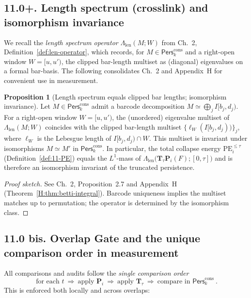 \documentclass[11pt]{article}
\numberwithin{equation}{section}
\theoremstyle{plain}
\theoremstyle{definition}
\theoremstyle{remark}
\newcommand{\Pers}{\mathsf{Pers}}
\theoremstyle{plain}
\theoremstyle{definition}
\numberwithin{equation}{section}
\newtheorem{proposition}[theorem]{Proposition}
\theoremstyle{definition}
\numberwithin{equation}{section}
\theoremstyle{plain}
\theoremstyle{definition}
\theoremstyle{remark}
\newcommand{\Len}{\Lambda_{\mathrm{len}}}
\begin{document}
\subsection*{11.0+. Length spectrum (crosslink) and isomorphism invariance}
We recall the \emph{length spectrum operator} $\Len(M;W)$ from Ch.~2, Definition~\ref{def:len-operator}, which records, for $M\in\Pers^{\mathrm{cons}}_k$ and a right-open window $W=[u,u')$, the clipped bar-length multiset as (diagonal) eigenvalues on a formal bar-basis. The following consolidates Ch.~2 and Appendix~H for convenient use in measurement.

\begin{proposition}[Length spectrum equals clipped bar lengths; isomorphism invariance]\label{prop:11-len}
Let $M\in\Pers^{\mathrm{cons}}_k$ admit a barcode decomposition $M\simeq \bigoplus_j I[b_j,d_j)$. For a right-open window $W=[u,u')$, the (unordered) eigenvalue multiset of $\Len(M;W)$ coincides with the clipped bar-length multiset $\{\ell_W(I[b_j,d_j))\}_j$, where $\ell_W$ is the Lebesgue length of $I[b_j,d_j)\cap W$. This multiset is invariant under isomorphisms $M\simeq M'$ in $\Pers^{\mathrm{cons}}_k$. In particular, the total collapse energy $\mathrm{PE}^{\le\tau}_i$ (Definition~\ref{def:11-PE}) equals the $L^1$-mass of $\Len\!\big(\mathbf{T}_\tau\mathbf{P}_i(F);[0,\tau]\big)$ and is therefore an isomorphism invariant of the truncated persistence.
\end{proposition}

\begin{proof}[Proof sketch]
See Ch.~2, Proposition~2.7 and Appendix~H (Theorem~\ref{H:thm:betti-integral}). Barcode uniqueness implies the multiset matches up to permutation; the operator is determined by the isomorphism class.
\end{proof}

\subsection*{11.0 bis. Overlap Gate and the unique comparison order in measurement}
All comparisons and audits follow the \emph{single comparison order}
\[
\boxed{\ \text{for each } t\ \Longrightarrow\ \text{apply } \mathbf{P}_i \ \Longrightarrow\ \text{apply } \mathbf{T}_\tau \ \Longrightarrow\ \text{compare in }\Pers^{\mathrm{cons}}_k\ }.
\]
This is enforced both locally and across overlaps:
\end{document}
